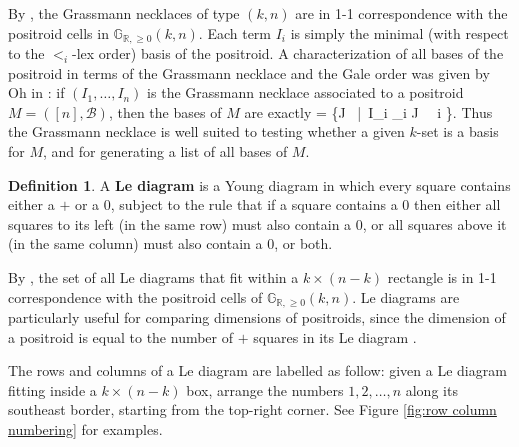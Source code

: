 \documentclass[11pt]{article}
\newcommand{\R}{\mathbb{R}}
\newcommand{\Gr}{\mathbb{G}_{\R, \geq 0}}
\def\ba #1\ea{\begin{align} #1 \end{align}}
\newcommand{\cB}{\mathcal{B}}
\newcommand{\gale}[1]{\preccurlyeq_{#1}}
\theoremstyle{remark}
\theoremstyle{definition}
\newtheorem{dfn}[thm]{Definition}
\begin{document}
By \cite[Theorem 17.1]{Postnikov}, the Grassmann necklaces of type $(k,n)$ are in 1-1 correspondence with the positroid cells in $\Gr(k,n)$. Each term $I_i$ is simply the minimal (with respect to the $<_i$-lex order) basis of the positroid. A characterization of all bases of the positroid in terms of the Grassmann necklace and the Gale order was given by Oh in \cite[Theorem 8]{Oh}: if $(I_1, \dots, I_n)$ is the Grassmann necklace associated to a positroid $M = ([n],\cB)$, then the bases of $M$ are exactly
\ba \cB = \left\{J \in {}\ \Big|\ I_i \gale{i} J \ \ \forall i \in [n]\right\}. \label{basesofmatroids}\ea
Thus the Grassmann necklace is well suited to testing whether a given $k$-set is a basis for $M$, and for generating a list of all bases of $M$.


\begin{dfn}\label{def:le diagram}
A {\bf Le diagram} is a Young diagram in which every square contains either a $+$ or a $0$, subject to the rule that if a square contains a $0$ then either all squares to its left (in the same row) must also contain a $0$, or all squares above it (in the same column) must also contain a $0$, or both.
\end{dfn}

By \cite[Theorem 6.5]{Postnikov}, the set of all Le diagrams that fit within a $k\times(n-k)$ rectangle is in 1-1 correspondence with the positroid cells of $\Gr(k,n)$. Le diagrams are particularly useful for comparing dimensions of positroids, since the dimension of a positroid is equal to the number of $+$ squares in its Le diagram \cite[Theorem 6.5]{Postnikov}.

The rows and columns of a Le diagram are labelled as follow: given a Le diagram fitting inside a $k\times (n-k)$ box, arrange the numbers $1,2, \dots, n$ along its southeast border, starting from the top-right corner. See Figure \ref{fig:row column numbering} for examples.
\end{document}

